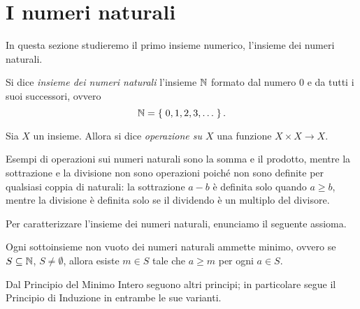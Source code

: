 \section{I numeri naturali}

In questa sezione studieremo il primo insieme numerico, l'insieme dei numeri naturali.

\begin{definition}
    Si dice \emph{insieme dei numeri naturali} l'insieme $\mathbb{N}$ formato dal numero $0$ e da tutti i suoi successori, ovvero \begin{equation}
        \mathbb{N} = \left\{\;0, 1, 2, 3, \dots\;\right\}.
    \end{equation}
\end{definition}

\begin{definition}
     Sia $X$ un insieme. Allora si dice \emph{operazione su $X$} una funzione $X \times X \to X$.
\end{definition}

Esempi di operazioni sui numeri naturali sono la somma e il prodotto, mentre la sottrazione e la divisione non sono operazioni poiché non sono definite per qualsiasi coppia di naturali: la sottrazione $a - b$ è definita solo quando $a \geq b$, mentre la divisione è definita solo se il dividendo è un multiplo del divisore.

Per caratterizzare l'insieme dei numeri naturali, enunciamo il seguente assioma.

\begin{axiom}
     \label{ax:min_intero} Ogni sottoinsieme non vuoto dei numeri naturali ammette minimo, ovvero se $S \subseteq \mathbb{N}$, $S \neq \emptyset$, allora esiste $m \in S$ tale che $a \geq m$ per ogni $a \in S$.
\end{axiom}

Dal Principio del Minimo Intero seguono altri principi; in particolare segue il Principio di Induzione in entrambe le sue varianti.

